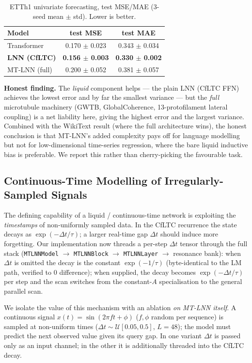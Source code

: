\documentclass[11pt]{article}
\theoremstyle{definition}
\begin{document}
\begin{table}[h]
\centering
\caption{ETTh1 univariate forecasting, test MSE/MAE (3-seed mean $\pm$ std). Lower is better.}
\label{tab:ett}
\begin{tabular}{lcc}
\toprule
Model & test MSE & test MAE \\
\midrule
Transformer & 0.170 $\pm$ 0.023 & 0.343 $\pm$ 0.034 \\
\textbf{LNN (CfLTC)} & \textbf{0.156 $\pm$ 0.003} & \textbf{0.330 $\pm$ 0.002} \\
MT-LNN (full) & 0.200 $\pm$ 0.052 & 0.381 $\pm$ 0.057 \\
\bottomrule
\end{tabular}
\end{table}

\textbf{Honest finding.} The \emph{liquid} component helps — the plain LNN (CfLTC FFN) achieves the lowest error and by far the smallest variance — but the \emph{full} microtubule machinery (GWTB, GlobalCoherence, 13-protofilament lateral coupling) is a net liability here, giving the highest error and the largest variance. Combined with the WikiText result (where the full architecture wins), the honest conclusion is that MT-LNN's added complexity pays off for language modelling but not for low-dimensional time-series regression, where the bare liquid inductive bias is preferable. We report this rather than cherry-picking the favourable task.

\subsection{Continuous-Time Modelling of Irregularly-Sampled Signals}
\label{sec:irregular}
The defining capability of a liquid / continuous-time network is exploiting the \emph{timestamps} of non-uniformly sampled data. In the CfLTC recurrence the state decays as $\exp(-\Delta t/\tau)$; a larger real-time gap $\Delta t$ should induce more forgetting. Our implementation now threads a per-step $\Delta t$ tensor through the full stack (\texttt{MTLNNModel} $\to$ \texttt{MTLNNBlock} $\to$ \texttt{MTLNNLayer} $\to$ resonance bank): when $\Delta t$ is omitted the decay is the constant $\exp(-1/\tau)$ (byte-identical to the LM path, verified to $0$ difference); when supplied, the decay becomes $\exp(-\Delta t/\tau)$ per step and the scan switches from the constant-$A$ specialisation to the general parallel scan.

We isolate the value of this mechanism with an ablation \emph{on MT-LNN itself}. A continuous signal $x(t)=\sin(2\pi f t + \phi)$ ($f,\phi$ random per sequence) is sampled at non-uniform times ($\Delta t \sim \mathcal{U}[0.05,0.5]$, $L=48$); the model must predict the next observed value given its query gap. In one variant $\Delta t$ is passed only as an input channel; in the other it is additionally threaded into the CfLTC decay.
\end{document}
